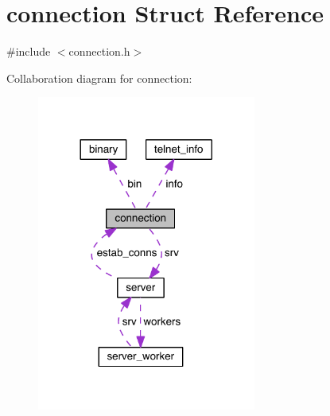 \hypertarget{structconnection}{}\section{connection Struct Reference}
\label{structconnection}


{\ttfamily \#include $<$connection.\+h$>$}



Collaboration diagram for connection\+:
\nopagebreak
\begin{figure}[H]
\begin{center}
\leavevmode
\includegraphics[width=204pt]{structconnection__coll__graph}
\end{center}
\end{figure}
